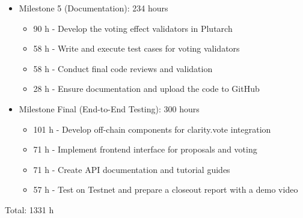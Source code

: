 \documentclass{article}
\begin{document}
\begin{itemize}
  \item Milestone 5 (Documentation): 234 hours
        \begin{itemize}
          \item 90 h - Develop the voting effect validators in Plutarch
          \item 58 h - Write and execute test cases for voting validators
          \item 58 h - Conduct final code reviews and validation
          \item 28 h - Ensure documentation and upload the code to GitHub
        \end{itemize}

  \item Milestone Final (End-to-End Testing): 300 hours
        \begin{itemize}
          \item 101 h - Develop off-chain components for clarity.vote integration
          \item 71 h - Implement frontend interface for proposals and voting
          \item 71 h - Create API documentation and tutorial guides
          \item 57 h - Test on Testnet and prepare a closeout report with a demo video
        \end{itemize}
\end{itemize}
Total: 1331 h
\end{document}
